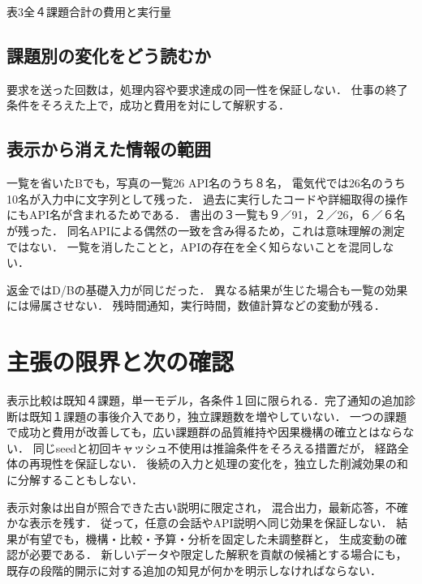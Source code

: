 \documentclass[uplatex,a4paper,twocolumn,10pt]{jsarticle}
\begin{document}
\begin{center}\begin{minipage}{\columnwidth}\centering
\small 表3\quad 全４課題合計の費用と実行量\par\smallskip
\InventoryTotals
\end{minipage}\end{center}

\subsection{課題別の変化をどう読むか}
\InventoryCaseEvidence

要求を送った回数は，処理内容や要求達成の同一性を保証しない．
仕事の終了条件をそろえた上で，成功と費用を対にして解釈する．

\subsection{表示から消えた情報の範囲}
一覧を省いたBでも，写真の一覧26 API名のうち８名，
電気代では26名のうち10名が入力中に文字列として残った．
過去に実行したコードや詳細取得の操作にもAPI名が含まれるためである．
書出の３一覧も９／91，２／26，６／６名が残った．
同名APIによる偶然の一致を含み得るため，これは意味理解の測定ではない．
一覧を消したことと，APIの存在を全く知らないことを混同しない．

返金ではD/Bの基礎入力が同じだった．
異なる結果が生じた場合も一覧の効果には帰属させない．
残時間通知，実行時間，数値計算などの変動が残る．
\InventoryVariation

\section{主張の限界と次の確認}
表示比較は既知４課題，単一モデル，各条件１回に限られる．完了通知の追加診断は既知１課題の事後介入であり，独立課題数を増やしていない．
一つの課題で成功と費用が改善しても，広い課題群の品質維持や因果機構の確立とはならない．
同じseedと初回キャッシュ不使用は推論条件をそろえる措置だが，
経路全体の再現性を保証しない．
後続の入力と処理の変化を，独立した削減効果の和に分解することもしない．

表示対象は出自が照合できた古い説明に限定され，
混合出力，最新応答，不確かな表示を残す．
従って，任意の会話やAPI説明へ同じ効果を保証しない．
結果が有望でも，機構・比較・予算・分析を固定した未調整群と，
生成変動の確認が必要である．
新しいデータや限定した解釈を貢献の候補とする場合にも，
既存の段階的開示に対する追加の知見が何かを明示しなければならない．
\end{document}
